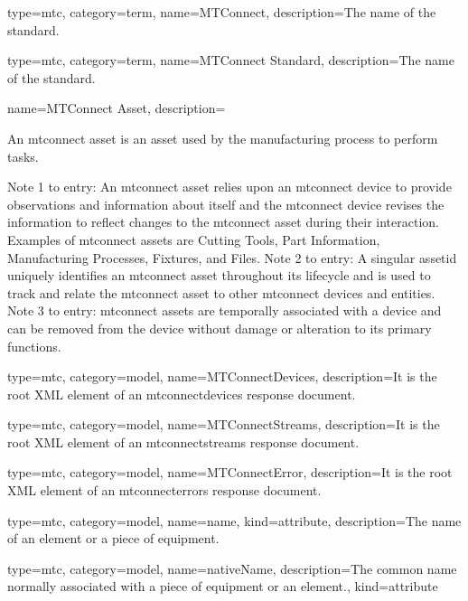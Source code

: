 {
  type=mtc,
  category=term,
  name={MTConnect},
  description={The name of the standard.}
}

{
  type=mtc,
  category=term,
  name={MTConnect Standard},
  description={The name of the standard.}
}

{
  name={MTConnect Asset},
  description={An \gls{mtconnect asset} is an \gls{asset} used by the manufacturing process to perform tasks.
  \newline \begin{note}
  Note 1 to entry: An \gls{mtconnect asset} relies upon an \gls{mtconnect device} to provide \glspl{observation} and information about itself and the \gls{mtconnect device} revises the information to reflect changes to the \gls{mtconnect asset} during their interaction. Examples of \glspl{mtconnect asset} are Cutting Tools, Part Information, Manufacturing Processes, Fixtures, and Files.
  \newline Note 2 to entry: A singular \gls{assetid} uniquely identifies an \gls{mtconnect asset} throughout its lifecycle and is used to track and relate the \gls{mtconnect asset} to other \glspl{mtconnect device} and entities. 
  \newline Note 3 to entry: \glspl{mtconnect asset} are temporally associated with a device and can be removed from the device without damage or alteration to its primary functions.
  \end{note}}
}


{
  type=mtc,
  category=model,
  name={MTConnectDevices},
  description={It is the root XML element of an \gls{mtconnectdevices response document}.}
}


{
  type=mtc,
  category=model,
  name={MTConnectStreams},
  description={It is the root XML element of an \gls{mtconnectstreams response document}.}
}

{
  type=mtc,
  category=model,
  name={MTConnectError},
  description={It is the root XML element of an \gls{mtconnecterrors response document}.}
}


{
  type=mtc,
  category=model,
  name={name},
  kind={attribute},
  description={The name of an element or a piece of equipment.}
}


{
  type=mtc,
  category=model,
  name={nativeName},
  description={The common name normally associated with a piece of equipment or an element.},
  kind={attribute}
}

